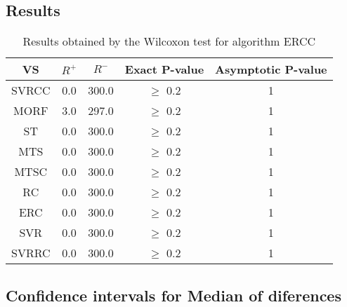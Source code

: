 \documentclass[a4paper,10pt]{article}
\begin{document}
\subsection{Results}

\begin{table}[!htp]
\centering\small
\begin{tabular}{
|c|c|c|c|c|}
\hline
 VS & $R^{+}$ & $R^{-}$ & Exact P-value & Asymptotic P-value \\ \hline 
SVRCC & 0.0 & 300.0 & $\geq$ 0.2 & 1\\ \hline 
MORF & 3.0 & 297.0 & $\geq$ 0.2 & 1\\ \hline 
ST & 0.0 & 300.0 & $\geq$ 0.2 & 1\\ \hline 
MTS & 0.0 & 300.0 & $\geq$ 0.2 & 1\\ \hline 
MTSC & 0.0 & 300.0 & $\geq$ 0.2 & 1\\ \hline 
RC & 0.0 & 300.0 & $\geq$ 0.2 & 1\\ \hline 
ERC & 0.0 & 300.0 & $\geq$ 0.2 & 1\\ \hline 
SVR & 0.0 & 300.0 & $\geq$ 0.2 & 1\\ \hline 
SVRRC & 0.0 & 300.0 & $\geq$ 0.2 & 1\\ \hline 

\end{tabular}
\caption{Results obtained by the Wilcoxon test for algorithm ERCC}
\end{table}

\subsection{Confidence intervals for Median of diferences}
\end{document}
